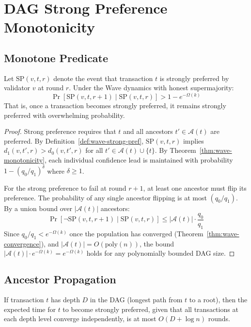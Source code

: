 \section{DAG Strong Preference Monotonicity}

\label{sec:wave-dag}

\subsection{Monotone Predicate}

\begin{theorem}
\label{thm:wave-dag-monotone}
Let $\text{SP}(v, t, r)$ denote the event that transaction $t$ is strongly preferred
by validator $v$ at round $r$. Under the Wave dynamics with honest supermajority:
\[
\Pr[\text{SP}(v, t, r+1) \mid \text{SP}(v, t, r)] > 1 - e^{-\Omega(k)}
\]
That is, once a transaction becomes strongly preferred, it remains strongly preferred
with overwhelming probability.
\end{theorem}

\begin{proof}
Strong preference requires that $t$ and all ancestors $t' \in \mathcal{A}(t)$ are preferred.
By Definition~\ref{def:wave-strong-pref}, $\text{SP}(v, t, r)$ implies $d_1(v, t', r) > d_0(v, t', r)$
for all $t' \in \mathcal{A}(t) \cup \{t\}$. By Theorem~\ref{thm:wave-monotonicity}, each individual
confidence lead is maintained with probability $1 - (q_0/q_1)^{\delta}$ where $\delta \geq 1$.

For the strong preference to fail at round $r+1$, at least one ancestor must flip its
preference. The probability of any single ancestor flipping is at most $(q_0/q_1)$.
By a union bound over $|\mathcal{A}(t)|$ ancestors:
\[
\Pr[\lnot \text{SP}(v, t, r+1) \mid \text{SP}(v, t, r)] \leq |\mathcal{A}(t)| \cdot \frac{q_0}{q_1}
\]
Since $q_0/q_1 < e^{-\Omega(k)}$ once the population has converged (Theorem~\ref{thm:wave-convergence}),
and $|\mathcal{A}(t)| = O(\text{poly}(n))$, the bound $|\mathcal{A}(t)| \cdot e^{-\Omega(k)} = e^{-\Omega(k)}$
holds for any polynomially bounded DAG size.
\end{proof}

\subsection{Ancestor Propagation}

\begin{lemma}
\label{lem:wave-propagation}
If transaction $t$ has depth $D$ in the DAG (longest path from $t$ to a root), then the
expected time for $t$ to become strongly preferred, given that all transactions at each
depth level converge independently, is at most $O(D + \log n)$ rounds.
\end{lemma}

